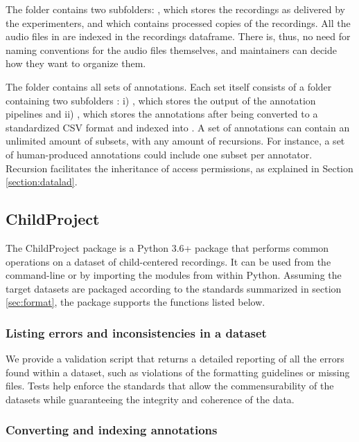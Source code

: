 \documentclass[smallextended]{svjour3}       %
\begin{document}
The  folder contains two subfolders: , which stores the recordings as delivered by the experimenters, and  which contains processed copies of the recordings. All the audio files in  are indexed in the recordings dataframe. There is, thus, no need for naming conventions for the audio files themselves, and maintainers can decide how they want to organize them.

The  folder contains all sets of annotations. Each set itself consists of a folder containing two subfolders : i) , which stores the output of the annotation pipelines and ii) , which stores the annotations after being converted to a standardized CSV format and indexed into . A set of annotations can contain an unlimited amount of subsets, with any amount of recursions. For instance, a set of human-produced annotations could include one subset per annotator. Recursion facilitates the inheritance of access permissions, as explained in Section \ref{section:datalad}.


\subsection{ChildProject}\label{section:childproject}

The ChildProject package is a Python 3.6+ package that performs common operations on a dataset of child-centered recordings. It can be used from the command-line or by importing the modules from within Python. Assuming the target datasets are packaged according to the standards summarized in section \ref{sec:format}, the package supports the functions listed below.

\subsubsection*{Listing errors and inconsistencies in a dataset}

We provide a validation script that returns a detailed reporting of all the errors found within a dataset, such as violations of the formatting guidelines or missing files. Tests help enforce the standards that allow the commensurability of the datasets while guaranteeing the integrity and coherence of the data.

\subsubsection*{Converting and indexing annotations}\label{section:annotations}
\end{document}
